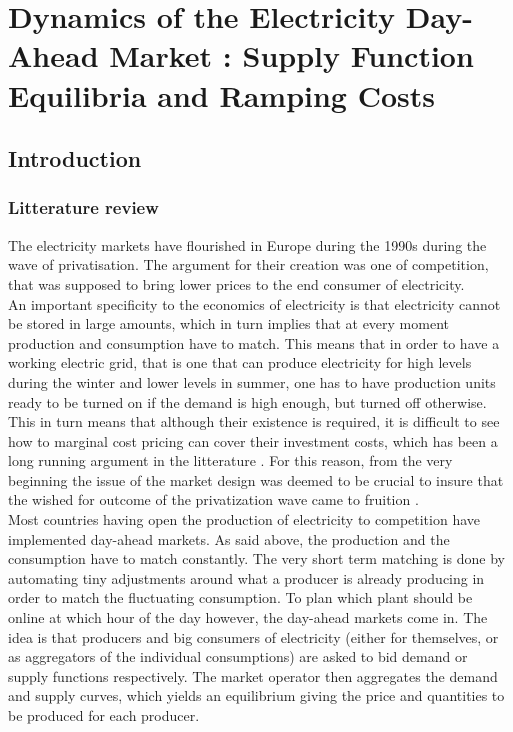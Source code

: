 


\renewcommand{\thesection}{\arabic{chapter}.\arabic{section}}



\chapter{Dynamics of the Electricity Day-Ahead Market : Supply Function Equilibria and Ramping Costs}
\label{chap:ch1}
\cleardoublepage

\doublespacing
\section{Introduction}
\subsection{Litterature review}
The electricity markets have flourished in Europe during the 1990s during the wave of privatisation. The argument for their creation was one of competition, that was supposed to bring lower prices to the end consumer of electricity.\\

An important specificity to the economics of electricity is that electricity cannot be stored in large amounts, which in turn implies that at every moment production and consumption have to match. This means that in order to have a working electric grid, that is one that can produce electricity for high levels during the winter and lower levels in summer, one has to have production units ready to be turned on if the demand is high enough, but turned off otherwise. This in turn means that although their existence is required, it is difficult to see how to marginal cost pricing can cover their investment costs, which has been a long running argument in the litterature \cite{boiteux1960peak}. For this reason, from the very beginning the issue of the market design was deemed to be crucial to insure that the wished for outcome of the privatization wave came to fruition \cite{green1991reshaping}. \\

Most countries having open the production of electricity to competition have implemented day-ahead markets. As said above, the production and the consumption have to match constantly. The very short term matching is done by automating tiny adjustments around what a producer is already producing in order to match the fluctuating consumption. To plan which plant should be online at which hour of the day however, the day-ahead markets come in. The idea is that producers and big consumers of electricity (either for themselves, or as aggregators of the individual consumptions) are asked to bid demand or supply functions respectively. The market operator then aggregates the demand and supply curves, which yields an equilibrium giving the price and quantities to be produced for each producer.  \\

